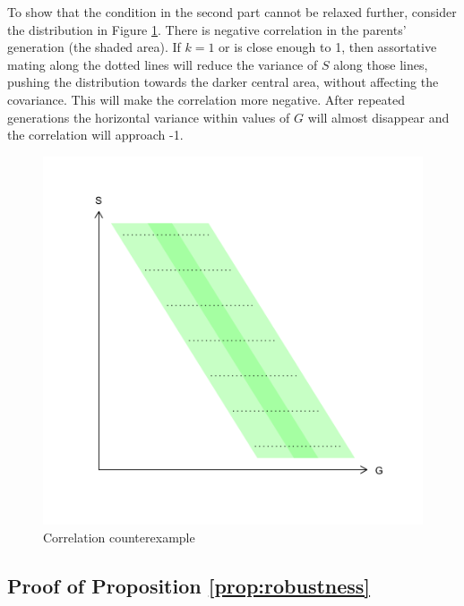 \documentclass[
]{article}
\begin{document}
To show that the condition in the second part cannot be relaxed further,
consider the distribution in Figure
\ref{fig:Correlation-counterexample}. There is negative correlation in
the parents' generation (the shaded area). If \(k = 1\) or is close enough
to 1, then assortative mating along the dotted lines will reduce the
variance of \(S\) along those lines, pushing the distribution towards the
darker central area, without affecting the covariance. This will make
the correlation more negative. After repeated generations the horizontal
variance within values of \(G\) will almost disappear and the correlation
will approach -1.

\begin{figure}
\begin{centering}
\includegraphics[width=0.5\columnwidth]{correlation-counterexample}
\par\end{centering}
\caption{Correlation counterexample\label{fig:Correlation-counterexample}}

\end{figure}

\hypertarget{proof-of-proposition}{%
\subsection{\texorpdfstring{Proof of Proposition \ref{prop:robustness}}{Proof of Proposition }}\label{proof-of-proposition}}
\end{document}

